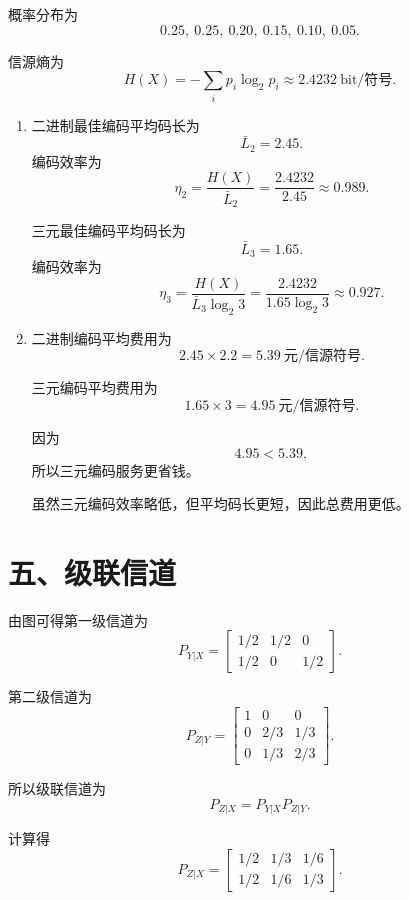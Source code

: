 \documentclass[UTF8,a4paper,12pt]{ctexart}
\begin{document}
概率分布为
\[
0.25,\ 0.25,\ 0.20,\ 0.15,\ 0.10,\ 0.05.
\]

信源熵为
\[
H(X)=-\sum_i p_i\log_2 p_i
\approx 2.4232\ \text{bit/符号}.
\]

\begin{enumerate}[label=\arabic*., leftmargin=2em]
\item 二进制最佳编码平均码长为
\[
\bar{L}_2=2.45.
\]
编码效率为
\[
\eta_2=\frac{H(X)}{\bar{L}_2}
=\frac{2.4232}{2.45}
\approx 0.989.
\]

三元最佳编码平均码长为
\[
\bar{L}_3=1.65.
\]
编码效率为
\[
\eta_3=\frac{H(X)}{\bar{L}_3\log_2 3}
=\frac{2.4232}{1.65\log_2 3}
\approx 0.927.
\]

\item 二进制编码平均费用为
\[
2.45\times 2.2=5.39\ \text{元/信源符号}.
\]

三元编码平均费用为
\[
1.65\times 3=4.95\ \text{元/信源符号}.
\]

因为
\[
4.95<5.39,
\]
所以三元编码服务更省钱。

虽然三元编码效率略低，但平均码长更短，因此总费用更低。
\end{enumerate}

\section*{五、级联信道}

由图可得第一级信道为
\[
P_{Y|X}=
\begin{bmatrix}
1/2&1/2&0\\
1/2&0&1/2
\end{bmatrix}.
\]

第二级信道为
\[
P_{Z|Y}=
\begin{bmatrix}
1&0&0\\
0&2/3&1/3\\
0&1/3&2/3
\end{bmatrix}.
\]

所以级联信道为
\[
P_{Z|X}=P_{Y|X}P_{Z|Y}.
\]

计算得
\[
P_{Z|X}=
\begin{bmatrix}
1/2&1/3&1/6\\
1/2&1/6&1/3
\end{bmatrix}.
\]
\end{document}
